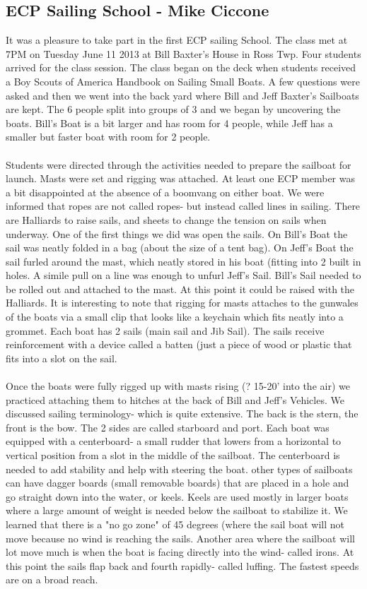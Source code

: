 \documentclass[10pt,a4paper]{article}
\newcommand\subsect[1]{%
  \subsection*{#1}%
  \addcontentsline{toc}{subsection}{#1}}
\begin{document}
\begin{multicols}{2}
\subsect{ECP Sailing School - Mike Ciccone}
It was a pleasure to take part in the first ECP sailing School.  The class met at 7PM on Tuesday June 11 2013 at Bill Baxter's House in Ross Twp.  Four students arrived for the class session.  The class began on the deck when students received a Boy Scouts of America Handbook on Sailing Small Boats.  A few questions were asked and then we went into the back yard where Bill and Jeff Baxter's Sailboats are kept.  The 6 people split into groups of 3 and we began by uncovering the boats.  Bill's Boat is a bit larger and has room for 4 people, while Jeff has a smaller but faster boat with room for 2 people. 
\\
\\
Students were directed through the activities needed to prepare the sailboat for launch.  Masts were set and rigging was attached.  At least one ECP member was a bit disappointed at the absence of a boomvang on either boat.  We were informed that ropes are not called ropes- but instead called lines in sailing.  There are Halliards to raise sails, and sheets to change the tension on sails when underway.  One of the first things we did was open the sails.  On Bill's Boat the sail was neatly folded in a bag (about the size of a tent bag).  On Jeff's Boat the sail furled around the mast, which neatly stored in his boat (fitting into 2 built in holes.  A simile pull on a line was enough to unfurl Jeff's Sail.  Bill's Sail needed to be rolled out and attached to the mast.  At this point it could be raised with the Halliards.  It is interesting to note that rigging for masts attaches to the gunwales of the boats via a small clip that looks like a keychain which fits neatly into a grommet.  Each boat has 2 sails (main sail and Jib Sail).  The sails receive reinforcement with a device called a batten (just a piece of wood or plastic that fits into a slot on the sail. 
\\
\\
Once the boats were fully rigged up with masts rising (? 15-20' into the air) we practiced attaching them to hitches at the back of Bill and Jeff's Vehicles.  We discussed sailing terminology- which is quite extensive.  The back is the stern, the front is the bow.  The 2 sides are called starboard and port.  Each boat was equipped with a centerboard- a small rudder that lowers from a horizontal to vertical position from a slot in the middle of the sailboat.  The centerboard is needed to add stability and help with steering the boat.  other types of sailboats can have dagger boards (small removable boards) that are placed in a hole and go straight down into the water, or keels.  Keels are used mostly in larger boats where a large amount of weight is needed below the sailboat to stabilize it.  We learned that there is a "no go zone" of 45 degrees (where the sail boat will not move because no wind is reaching the sails.  Another area where the sailboat will lot move much is when the boat is facing directly into the wind- called irons.  At this point the sails flap back and fourth rapidly- called luffing.  The fastest speeds are on a broad reach.

\end{multicols}
\end{document}
